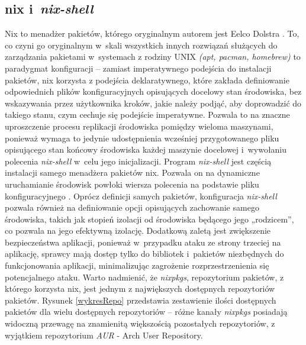 \subsection{nix i~\textit{nix-shell}}
Nix to menadżer pakietów, którego oryginalnym autorem jest Eelco Dolstra \cite{nix-repo}. To, co czyni go oryginalnym w~skali wszystkich innych rozwiązań służących do zarządzania pakietami w~systemach z rodziny UNIX \textit{(apt, pacman, homebrew)} to paradygmat konfiguracji -- zamiast imperatywnego podejścia do instalacji pakietów, nix korzysta z podejścia deklaratywnego, które zakłada definiowanie odpowiednich plików konfiguracyjnych opisujących docelowy stan środowiska, bez wskazywania przez użytkownika kroków, jakie należy podjąć, aby doprowadzić do takiego stanu, czym cechuje się podejście imperatywne. Pozwala to na znaczne uproszczenie procesu replikacji środowiska pomiędzy wieloma maszynami, ponieważ wymaga to jedynie udostępnienia wcześniej przygotowanego pliku opisującego stan końcowy środowiska każdej maszynie docelowej i~wywołaniu polecenia \textit{nix-shell} w~celu jego inicjalizacji. 
\newline \noindent Program \textit{nix-shell} jest częścią instalacji samego menadżera pakietów nix. Pozwala on na dynamiczne uruchamianie środowisk powłoki wiersza polecenia na podstawie pliku konfiguracyjnego \cite{nix-shell}. Oprócz definicji samych pakietów, konfiguracja \textit{nix-shell} pozwala również na definiowanie opcji opisujących zachowanie samego środowiska, takich jak stopień izolacji od środowiska będącego jego „rodzicem”, co pozwala na jego efektywną izolację. Dodatkową zaletą jest zwiększenie bezpieczeństwa aplikacji, ponieważ w~przypadku ataku ze strony trzeciej na aplikację, sprawcy mają dostęp tylko do bibliotek i~pakietów niezbędnych do funkcjonowania aplikacji, minimalizując zagrożenie rozprzestrzenienia się potencjalnego ataku.
\newline \noindent Warto nadmienić, że \textit{nixpkgs}, repozytorium pakietów, z którego korzysta nix, jest jednym z największych dostępnych repozytoriów pakietów. Rysunek \ref{wykresRepo} przedstawia zestawienie ilości dostępnych pakietów dla wielu dostępnych repozytoriów -- różne kanały \textit{nixpkgs} posiadają widoczną przewagę na znamienitą większością pozostałych repozytoriów, z wyjątkiem repozytorium \textit{AUR} - Arch User Repository.


